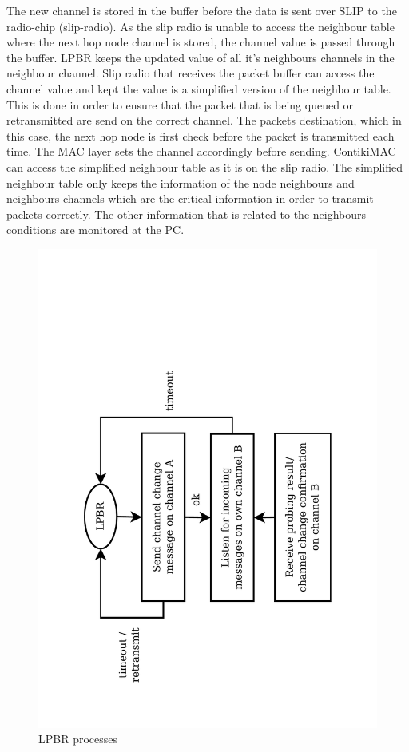 The new channel is stored in the buffer before the data is sent over SLIP to the radio-chip (slip-radio). As the slip radio is unable to access the neighbour table where the next hop node channel is stored, the channel value is passed through the buffer. LPBR keeps the updated value of all it's neighbours channels in the neighbour channel. Slip radio that receives the packet buffer can access the channel value and kept the value is a simplified version of the neighbour table. This is done in order to ensure that the packet that is being queued or retransmitted are send on the correct channel. The packets destination, which in this case, the next hop node is first check before the packet is transmitted each time. The MAC layer sets the channel accordingly before sending. ContikiMAC can access the simplified neighbour table as it is on the slip radio. The simplified neighbour table only keeps the information of the node neighbours and neighbours channels which are the critical information in order to transmit packets correctly. The other information that is related to the neighbours conditions are monitored at the PC. 

\begin{figure}
\centering
\includegraphics[trim=2cm 1cm 2cm 4cm, clip=true, totalheight=0.55\textheight, angle=270]{lpbrProcess.pdf}
\caption{LPBR processes}
\label{lpbrProcess}
\end{figure}

